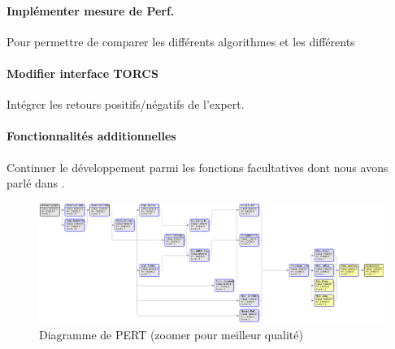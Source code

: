 \documentclass[a4paper,12pt]{article}
\begin{document}
      \paragraph{Implémenter mesure de Perf.} Pour permettre de comparer les différents algorithmes et les différents 
      
      \paragraph{Modifier interface TORCS} Intégrer les retours positifs/négatifs de l'expert.
      
      \paragraph{Fonctionnalités additionnelles} Continuer le développement parmi les fonctions facultatives dont nous
      avons parlé dans \cite{CdC}.
      
      \begin{figure}[H]
	\centerline{\includegraphics[width=19cm, clip=true, trim= 0 0 0 0]{../images/Gantt_PERT.png} }
	\caption{Diagramme de PERT \scriptsize{(zoomer pour meilleur qualité)}}
      \end{figure}
    
\end{document}
